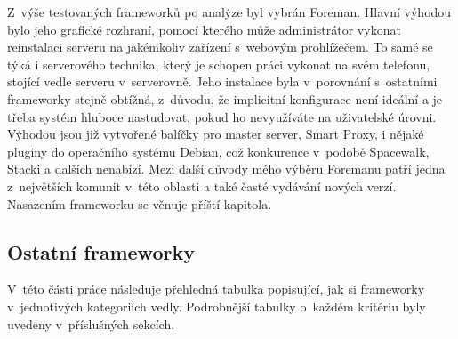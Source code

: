 Z~výše testovaných frameworků po analýze byl vybrán Foreman. Hlavní výhodou bylo jeho grafické rozhraní, pomocí kterého může administrátor vykonat reinstalaci serveru na jakémkoliv zařízení s~webovým prohlížečem. To samé se týká i serverového technika, který je schopen práci vykonat na svém telefonu, stojící vedle serveru v~serverovně. Jeho instalace byla v~porovnání s~ostatními frameworky stejně obtížná, z~důvodu, že implicitní konfigurace není ideální a je třeba systém hluboce nastudovat, pokud ho nevyužíváte na uživatelské úrovni. Výhodou jsou již vytvořené balíčky pro master server, Smart Proxy, i nějaké pluginy do operačního systému Debian, což konkurence v~podobě Spacewalk, Stacki a dalších nenabízí. Mezi další důvody mého výběru Foremanu patří jedna z~největších komunit v~této oblasti a také časté vydávání nových verzí. Nasazením frameworku se věnuje příští kapitola.


\subsection{Ostatní frameworky}


V~této části práce následuje přehledná tabulka popisující, jak si frameworky v~jednotivých kategoriích vedly. Podrobnější tabulky o~každém kritériu byly uvedeny v~příslušných sekcích.
\newpage
\begin{table}[H]
\centering
\caption{Srovnání frameworků}
\label{srovnani-frameworku}
\end{table}

